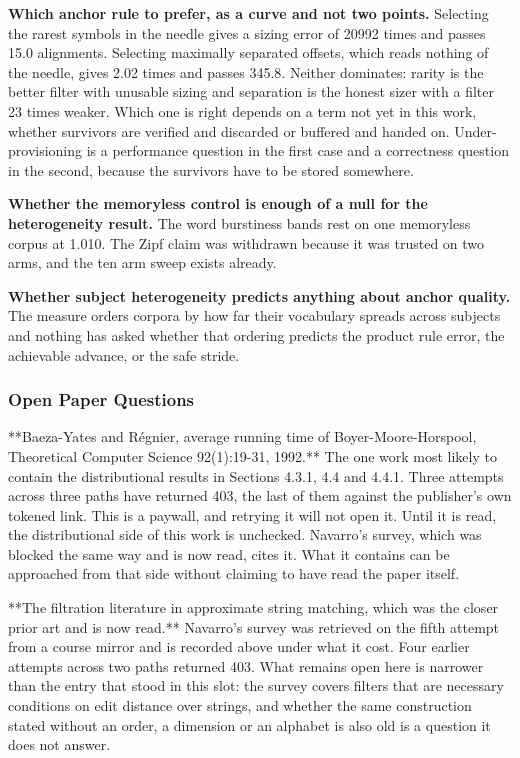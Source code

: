 \textbf{Which anchor rule to prefer, as a curve and not two points.} Selecting the rarest symbols in the needle gives a sizing error of 20992 times and passes 15.0 alignments. Selecting maximally separated offsets, which reads nothing of the needle, gives 2.02 times and passes 345.8. Neither dominates: rarity is the better filter with unusable sizing and separation is the honest sizer with a filter 23 times weaker. Which one is right depends on a term not yet in this work, whether survivors are verified and discarded or buffered and handed on. Under-provisioning is a performance question in the first case and a correctness question in the second, because the survivors have to be stored somewhere.

\textbf{Whether the memoryless control is enough of a null for the heterogeneity result.} The word burstiness bands rest on one memoryless corpus at 1.010. The Zipf claim was withdrawn because it was trusted on two arms, and the ten arm sweep exists already.

\textbf{Whether subject heterogeneity predicts anything about anchor quality.} The measure orders corpora by how far their vocabulary spreads across subjects and nothing has asked whether that ordering predicts the product rule error, the achievable advance, or the safe stride.

\subsubsection{Open Paper Questions}

**Baeza-Yates and Régnier, average running time of Boyer-Moore-Horspool, Theoretical Computer Science 92(1):19-31, 1992.** The one work most likely to contain the distributional results in Sections 4.3.1, 4.4 and 4.4.1. Three attempts across three paths have returned 403, the last of them against the publisher's own tokened link. This is a paywall, and retrying it will not open it. Until it is read, the distributional side of this work is unchecked. Navarro's survey, which was blocked the same way and is now read, cites it. What it contains can be approached from that side without claiming to have read the paper itself.

**The filtration literature in approximate string matching, which was the closer prior art and is now read.** Navarro's survey was retrieved on the fifth attempt from a course mirror and is recorded above under what it cost. Four earlier attempts across two paths returned 403. What remains open here is narrower than the entry that stood in this slot: the survey covers filters that are necessary conditions on edit distance over strings, and whether the same construction stated without an order, a dimension or an alphabet is also old is a question it does not answer.

